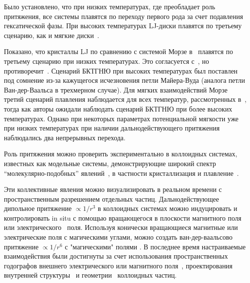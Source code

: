 Было установлено, что при низких температурах, где преобладает роль притяжения, все системы плавятся по переходу первого рода за счет подавления гексатической фазы. При высоких температурах LJ-диски плавятся по третьему сценарию, как и мягкие диски~\cite{10.1103/physrevlett.114.035702}.

Показано, что кристаллы LJ по сравнению с системой Морзе в~\cite{10.1103/physrevb.103.094107} плавятся по третьему сценарию при низких температурах. Это согласуется с~\cite{10.1103/physreve.99.022145}, но противоречит~\cite{10.1103/physrevlett.114.035702}. Сценарий БКТГНЮ при высоких температурах был поставлен под сомнение из-за кажущегося исчезновения петли Майера-Вуда (аналога петли Ван-дер-Ваальса в трехмерном случае). Для мягких взаимодействий Морзе третий сценарий плавления наблюдается для всех температур, рассмотренных в~\cite{10.1103/physrevb.103.094107}, тогда как авторы ожидали наблюдать сценарий БКТГНЮ при более высоких температурах. Однако при некоторых параметрах потенциальной мягкости уже при низких температурах при наличии дальнодействующего притяжения наблюдались два непрерывных перехода.

Роль притяжения можно проверить экспериментально в коллоидных системах, известных как модельные системы, демонстрирующие широкий спектр ``молекулярно-подобных'' явлений~\cite{book.fernandez, book.ivlev, 10.1016/0370-1573(94)90017-5, 10.1038/natrevmats.2015.11, 10.1039/c9sm01953g}, в частности кристаллизация и плавление~\cite{10.1126/science.1112399, 10.1039/c2sm26473k, 10.1103/physrevlett.82.2721, 10.1103/physrevlett.85.3656, 10.1103/physrevlett.118.088003, 10.1039/c2sm27654b, 10.1126/science.1224763, 10.1038/s41598-021-97124-7}.

Эти коллективные явления можно визуализировать в реальном времени с пространственным разрешением отдельных частиц. Дальнодействующее дипольное притяжение $\propto 1/r^3$ в коллоидных системах можно индуцировать и контролировать in situ с помощью вращающегося в плоскости магнитного поля~\cite{10.1088/0034-4885/76/12/126601, 10.1039/c3sm50306b, 10.1039/c3sm27620a, 10.1103/physrevmaterials.2.025602} или электрического~\cite{10.1088/1367-2630/8/11/267, 10.1063/1.3115641, 10.1021/la2014804, 10.1021/la500178b, 10.1039/c1sm06414b, 10.1038/s41598-017-14001-y} поля.
Используя конически вращающиеся магнитные или электрические поля с магическими углами, можно создать ван-дер-ваальсово притяжение $\propto 1/r^6$ с "магическими" полями \cite{10.1021/la500896e, 10.1103/physrevlett.103.228301}.
В последнее время настраиваемые взаимодействия были достигнуты за счет использования пространственных годографов внешнего электрического или магнитного поля~\cite{10.1039/d0sm01046d}, проектирования внутренней структуры~\cite{10.1063/5.0055566} и геометрии~\cite{10.1063/5.0060705} коллоидных частиц.

